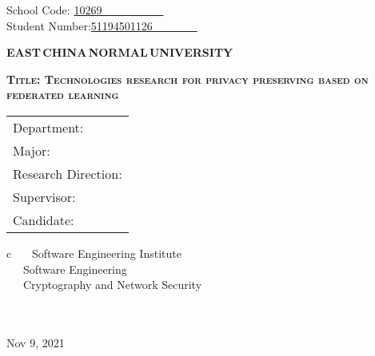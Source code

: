 \newpage

\pagestyle{empty}

\hskip 1.4cm {School Code: \underline{10269~~~~~~~~~~~\qquad}}\\
\hspace*{\fill} {Student Number:\underline{51194501126~~~~~~~~}}
\vskip 2cm

\begin{center}
{\Huge \bf EAST\,CHINA\,NORMAL\,UNIVERSITY}
\end{center}

\vskip 3cm

\begin{center}
{\huge \bf \scshape Title: Technologies research for privacy preserving based on federated learning}
\end{center}

\vskip 2cm {\large
\begin{center}
\begin{tabular}{l}
Department:\\
Major:\\
Research Direction:\\
Supervisor:\\
Candidate:
\end{tabular}
\begin{tabular}c
~~~Software Engineering Institute\\
\hline ~~~Software Engineering  \\
\hline ~~~Cryptography and Network Security\\
\hline ~~~  \\%
\hline ~~~  \\%
\hline
\end{tabular}
\end{center}}

\vskip 30mm

\begin{center}
{\Large Nov 9, 2021}
\end{center}
